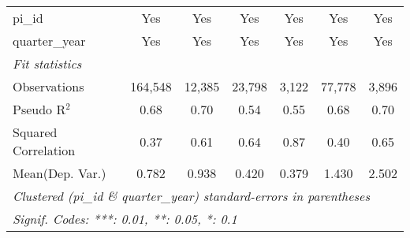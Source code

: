 \begin{tabular}{lcccccc}
   pi\_id                                                     & Yes           & Yes            & Yes          & Yes           & Yes           & Yes\\  
   quarter\_year                                              & Yes           & Yes            & Yes          & Yes           & Yes           & Yes\\  
   \midrule
   \emph{Fit statistics}\\
   Observations                                               & 164,548       & 12,385         & 23,798       & 3,122         & 77,778        & 3,896\\  
   Pseudo R$^2$                                               & 0.68          & 0.70           & 0.54         & 0.55          & 0.68          & 0.70\\  
   Squared Correlation                                        & 0.37          & 0.61           & 0.64         & 0.87          & 0.40          & 0.65\\  
Mean(Dep. Var.) & 0.782 & 0.938 & 0.420 & 0.379 & 1.430 & 2.502 \\
   \midrule \midrule
   \multicolumn{7}{l}{\emph{Clustered (pi\_id \& quarter\_year) standard-errors in parentheses}}\\
   \multicolumn{7}{l}{\emph{Signif. Codes: ***: 0.01, **: 0.05, *: 0.1}}\\
\end{tabular}
\par\endgroup
